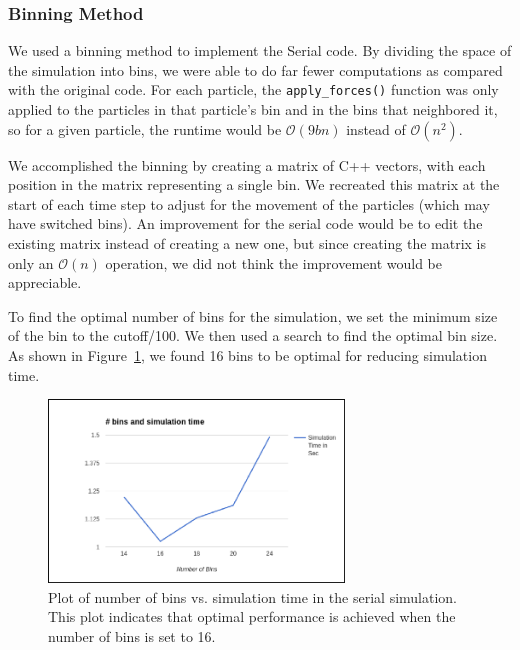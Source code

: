 \documentclass{article}
\begin{document}
\subsubsection{Binning Method}
We used a binning method to implement the Serial code. By dividing the space
of the simulation into bins, we were able to do far fewer computations as
compared with the original code. For each particle, the
\texttt{apply\_forces()} function was only applied to the particles in that
particle's bin and in the bins that neighbored it, so for a given particle, the
runtime would be $\mathcal{O}(9b n)$ instead of $\mathcal{O}(n^2)$.

We accomplished the binning by creating a matrix of C++ vectors, with each
position in the matrix representing a single bin. We recreated this matrix at
the start of each time step to adjust for the movement of the particles (which
may have switched bins). An improvement for the serial code would be to edit the
existing matrix instead of creating a new one, but since creating the matrix is
only an $\mathcal{O}(n)$ operation, we did not think the improvement would be
appreciable.

To find the optimal number of bins for the simulation, we set the minimum size
of the bin to the cutoff/100.  We then used a search to find the optimal bin
size. As shown in Figure~\ref{fig:bin_time}, we found 16 bins to be optimal for
reducing simulation time.

\begin{figure}[ht]
\centering
\includegraphics[width=0.7\textwidth]{Picture1.png}
\caption{Plot of number of bins vs. simulation time in the serial simulation.
  This plot indicates that optimal performance is achieved when the number of
  bins is set to 16.}
\label{fig:bin_time}
\end{figure}
\end{document}
